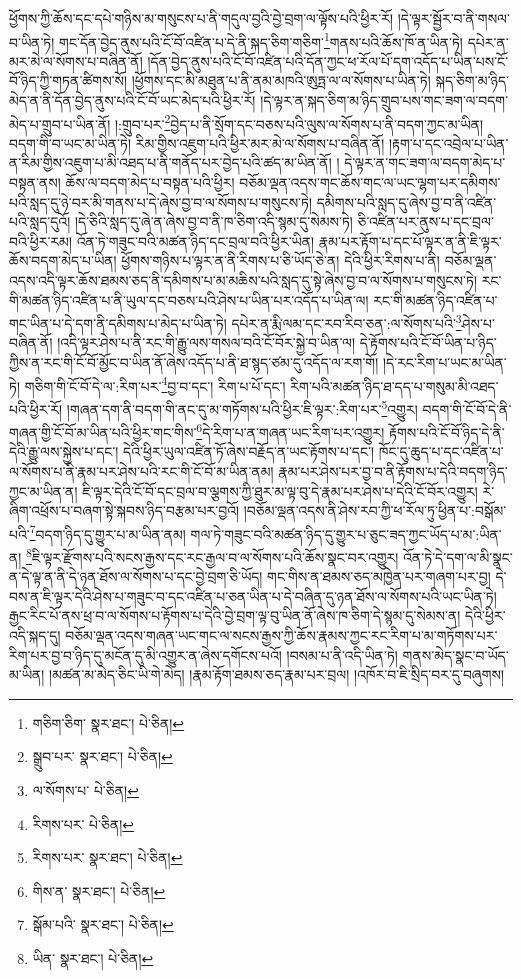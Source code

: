 ཕྱོགས་ཀྱི་ཆོས་དང་དཔེ་གཉིས་མ་གསུངས་པ་ནི་གདུལ་བྱའི་བྱེ་བྲག་ལ་ལྟོས་པའི་ཕྱིར་རོ། །དེ་ལྟར་སྦྱོར་བ་ནི་གསལ་བ་ཡིན་ཏེ། གང་དོན་བྱེད་ནུས་པའི་ངོ་བོ་འཛིན་པ་དེ་ནི་སྐད་ཅིག་གཅིག་\footnote{གཅིག་ཅིག་  སྣར་ཐང་།  པེ་ཅིན། }གནས་པའི་ཆོས་ཁོ་ན་ཡིན་ཏེ། དཔེར་ན་མར་མེ་ལ་སོགས་པ་བཞིན་ནོ། །དོན་བྱེད་ནུས་པའི་ངོ་བོ་འཛིན་པའི་དོན་ཀྱང་ཕ་རོལ་པོ་དག་འདོད་པ་ཡིན་པས་ངོ་བོ་ཉིད་ཀྱི་གཏན་ཚིགས་སོ། །ཕྱོགས་དང་མི་མཐུན་པ་ནི་ནམ་མཁའི་ཨུཏྤ་ལ་ལ་སོགས་པ་ཡིན་ཏེ། སྐད་ཅིག་མ་ཉིད་མེད་ན་ནི་དོན་བྱེད་ནུས་པའི་ངོ་བོ་ཡང་མེད་པའི་ཕྱིར་རོ། །དེ་ལྟར་ན་སྐད་ཅིག་མ་ཉིད་གྲུབ་པས་གང་ཟག་ལ་བདག་མེད་པ་གྲུབ་པ་ཡིན་ནོ། །:གྲུབ་པར་\footnote{སྒྲུབ་པར་  སྣར་ཐང་།  པེ་ཅིན། }བྱེད་པ་ནི་སྲོག་དང་བཅས་པའི་ལུས་ལ་སོགས་པ་ནི་བདག་ཀྱང་མ་ཡིན། བདག་གི་བ་ཡང་མ་ཡིན་ཏེ། རིམ་གྱིས་འཇུག་པའི་ཕྱིར་མར་མེ་ལ་སོགས་པ་བཞིན་ནོ། །རྟག་པ་དང་འབྲེལ་པ་ཡིན་ན་རིམ་གྱིས་འཇུག་པ་མི་འཐད་པ་ནི་གནོད་པར་བྱེད་པའི་ཚད་མ་ཡིན་ནོ། །
དེ་ལྟར་ན་གང་ཟག་ལ་བདག་མེད་པ་བསྟན་ནས། ཆོས་ལ་བདག་མེད་པ་བསྟན་པའི་ཕྱིར། བཅོམ་ལྡན་འདས་གང་ཆོས་གང་ལ་ཡང་ལྷག་པར་དམིགས་པའི་སླད་དུ་ཉེ་བར་མི་གནས་པ་དེ་ཞེས་བྱ་བ་ལ་སོགས་པ་གསུངས་ཏེ། དམིགས་པའི་སླད་དུ་ཞེས་བྱ་བ་ནི་འཛིན་པའི་སླད་དུའོ། །དེ་ཅིའི་སླད་དུ་ཞེ་ན་ཞེས་བྱ་བ་ནི་ཁ་ཅིག་འདི་སྙམ་དུ་སེམས་ཏེ། ཅི་འཛིན་པར་ནུས་པ་དང་བྲལ་བའི་ཕྱིར་རམ། འོན་ཏེ་གཟུང་བའི་མཚན་ཉིད་དང་བྲལ་བའི་ཕྱིར་ཡིན། རྣམ་པར་རྟོག་པ་དང་པོ་ལྟར་ན་ནི་ཇི་ལྟར་ཆོས་བདག་མེད་པ་ཡིན། ཕྱོགས་གཉིས་པ་ལྟར་ན་ནི་རིགས་པ་ཅི་ཡོད་ཅེ་ན། དེའི་ཕྱིར་རིགས་པ་ནི། བཅོམ་ལྡན་འདས་འདི་ལྟར་ཆོས་ཐམས་ཅད་ནི་དམིགས་པ་མ་མཆིས་པའི་སླད་དུ་སྟེ་ཞེས་བྱ་བ་ལ་སོགས་པ་གསུངས་ཏེ། རང་གི་མཚན་ཉིད་འཛིན་པ་ནི་ཡུལ་དང་བཅས་པའི་ཤེས་པ་ཡིན་པར་འདོད་པ་ཡིན་ལ། རང་གི་མཚན་ཉིད་འཛིན་པ་གང་ཡིན་པ་དེ་དག་ནི་དམིགས་པ་མེད་པ་ཡིན་ཏེ། དཔེར་ན་རྨི་ལམ་དང་རབ་རིབ་ཅན་:ལ་སོགས་པའི་\footnote{ལ་སོགས་པ་  པེ་ཅིན། }ཤེས་པ་བཞིན་ནོ། །འདི་ལྟར་ཤེས་པ་ནི་རང་གི་རྒྱུ་ལས་གསལ་བའི་ངོ་བོར་སྐྱེ་བ་ཡིན་ལ། དེ་རྟོགས་པའི་ངོ་བོ་ཡིན་པ་ཉིད་ཀྱིས་ན་རང་གི་ངོ་བོ་མྱོང་བ་ཡིན་ནོ་ཞེས་འདོད་པ་ནི་ཐ་སྙད་ཙམ་དུ་འདོད་ལ་རག་གོ། །དེ་རང་རིག་པ་ཡང་མ་ཡིན་ཏེ། གཅིག་གི་ངོ་བོ་དེ་ལ་:རིག་པར་\footnote{རིགས་པར་  པེ་ཅིན། }བྱ་བ་དང་། རིག་པ་པོ་དང་། རིག་པའི་མཚན་ཉིད་ཐ་དད་པ་གསུམ་མི་འཐད་པའི་ཕྱིར་རོ། །གཞན་དག་ནི་བདག་གི་ནང་དུ་མ་གཏོགས་པའི་ཕྱིར་ཇི་ལྟར་:རིག་པར་\footnote{རིགས་པར་  སྣར་ཐང་།  པེ་ཅིན། }འགྱུར། བདག་གི་ངོ་བོ་དེ་ནི་གཞན་གྱི་ངོ་བོ་མ་ཡིན་པའི་ཕྱིར་གང་གིས་\footnote{གིས་ན་  སྣར་ཐང་།  པེ་ཅིན། }དེ་རིག་པ་ན་གཞན་ཡང་རིག་པར་འགྱུར། རྟོགས་པའི་ངོ་བོ་ཉིད་དེ་ནི་དེའི་རྒྱུ་ལས་སྐྱེས་པ་དང་། དེའི་ཕྱིར་ཡུལ་འཛིན་ཏོ་ཞེས་བརྗོད་ན་ཡང་རྟོགས་པ་དང་། ཁོང་དུ་ཆུད་པ་དང་འཛིན་པ་ལ་སོགས་པ་ནི་རྣམ་པར་ཤེས་པའི་རང་གི་ངོ་བོ་མ་ཡིན་ནམ། རྣམ་པར་ཤེས་པར་བྱ་བ་ནི་རྟོགས་པ་དེའི་བདག་ཉིད་ཀྱང་མ་ཡིན་ན། ཇི་ལྟར་དེའི་ངོ་བོ་དང་བྲལ་བ་ལྕགས་ཀྱི་ཐུར་མ་ལྟ་བུ་དེ་རྣམ་པར་ཤེས་པ་དེའི་ངོ་བོར་འགྱུར། རེ་ཞིག་འཕྲོས་པ་བཞག་སྟེ་སྐབས་ཉིད་བརྩམ་པར་བྱའོ། །བཅོམ་ལྡན་འདས་ནི་ཤེས་རབ་ཀྱི་ཕ་རོལ་ཏུ་ཕྱིན་པ་:བསྒོམ་པའི་\footnote{སྒོམ་པའི་  སྣར་ཐང་།  པེ་ཅིན། }བདག་ཉིད་དུ་གྱུར་པ་མ་ཡིན་ནམ། གལ་ཏེ་གཟུང་བའི་མཚན་ཉིད་དུ་གྱུར་པ་ཅུང་ཟད་ཀྱང་ཡོད་པ་མ་:ཡིན་ན། \footnote{ཡིན་  སྣར་ཐང་།  པེ་ཅིན། }ཇི་ལྟར་རྫོགས་པའི་སངས་རྒྱས་དང་རང་རྒྱལ་བ་ལ་སོགས་པའི་ཆོས་སྣང་བར་འགྱུར། འོན་ཏེ་དེ་དག་ལ་མི་སྣང་ན་དེ་ལྟ་ན་ནི་དེ་ཉན་ཐོས་ལ་སོགས་པ་དང་བྱེ་བྲག་ཅི་ཡོད། གང་གིས་ན་ཐམས་ཅད་མཁྱེན་པར་གཞག་པར་བྱ། དེ་བས་ན་ཇི་ལྟར་དེའི་ཤེས་པ་གཟུང་བ་དང་འཛིན་པ་ཅན་ཡིན་པ་དེ་བཞིན་དུ་ཉན་ཐོས་ལ་སོགས་པའི་ཡང་ཡིན་ཏེ། རྒྱང་རིང་པོ་ནས་ཕྲ་བ་ལ་སོགས་པ་རྟོགས་པ་དེའི་བྱེ་བྲག་ལྟ་བུ་ཡིན་ནོ་ཞེས་ཁ་ཅིག་དེ་སྙམ་དུ་སེམས་ན། དེའི་ཕྱིར་འདི་སྐད་དུ། བཅོམ་ལྡན་འདས་གཞན་ཡང་གང་ལ་སངས་རྒྱས་ཀྱི་ཆོས་རྣམས་ཀྱང་རང་རིག་པ་མ་གཏོགས་པར་རིག་པར་བྱ་བ་ཉིད་དུ་མངོན་དུ་མི་འགྱུར་ན་ཞེས་དགོངས་པའོ། །བསམ་པ་ནི་འདི་ཡིན་ཏེ། གནས་མེད་སྣང་བ་ཡོད་མ་ཡིན། །མཚན་མ་མེད་ཅིང་ཡི་གེ་མེད། །རྣམ་རྟོག་ཐམས་ཅད་རྣམ་པར་བྲལ། །འཁོར་བ་ཇི་སྲིད་བར་དུ་བཞུགས། 